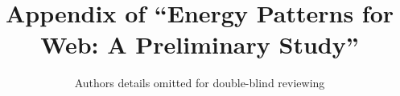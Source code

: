 \documentclass[sigconf,review,anonymous]{acmart}
\begin{document}
\title{Appendix of ``Energy Patterns for Web: A Preliminary Study''}

\author{Authors details omitted for double-blind reviewing}

\begin{comment}
\author{Pooja Rani}
\email{rani@ifi.uzh.ch}
\orcid{0000-0001-5127-4042}
\affiliation{%
  \institution{University of Zurich}
  \city{Zurich}
  \country{Switzerland}
}

\author{Jonas Zellweger}
\affiliation{%
  \institution{University of Zurich}
  \city{Zurich}
  \country{Switzerland}
}

\author{Veronika Kousadianos}
\affiliation{%
 \institution{University of Bern}
 \city{Bern}
 \country{Switzerland}}

 \author{Luis Cruz}
 \email{L.Cruz@tudelft.nl}
\affiliation{%
 \institution{Software Engineering, TUDelft}
 \country{Netherlands}}
 
\author{Timo Kehrer}
\email{timo.kehrer@unibe.ch}
\affiliation{%
 \institution{University of Bern}
 \city{Bern}
 \country{Switzerland}}

\author{Alberto Bacchelli}
\email{bacchelli@ifi.uzh.ch}
\orcid{0000-0003-0193-6823}
\affiliation{%
  \institution{University of Zurich}
  \streetaddress{Binzm\"{u}hlestrasse 14}
  \city{Zurich}
  \state{ZH}
  \country{Switzerland}
  \postcode{8050}
}

\renewcommand{\shortauthors}{Rani et al.}
\end{comment}

\maketitle







\end{document}

